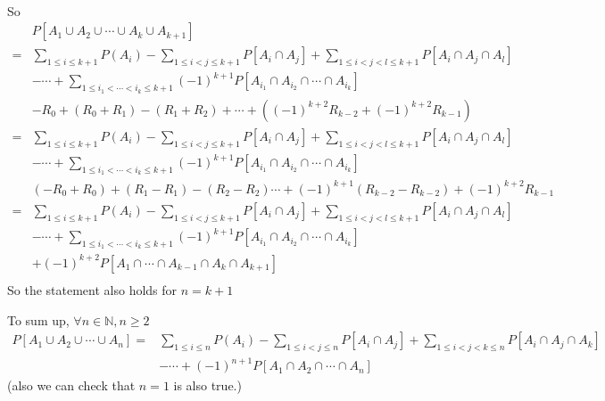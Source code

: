 \documentclass[a4paper,12pt,titlepage]{article}
\begin{document}
\begin{enumerate}
\begin{align*}
\end{align*}
So
\begin{align*}
&P[A_1\cup A_2\cup\cdots\cup A_k\cup A_{k+1}]\\
=&\sum\limits_{1\leqslant i\leqslant k+1}P(A_i)-\sum\limits_{1\leqslant i<j\leqslant k+1}P[A_i\cap A_j]+\sum\limits_{1\leqslant i<j<l\leqslant k+1}P[A_i\cap A_j\cap A_l]\\
&-\cdots+\sum\limits_{1\leqslant i_1<\cdots<i_{k}\leqslant k+1}(-1)^{k+1}P[A_{i_1}\cap A_{i_2}\cap\cdots\cap A_{i_k}]\\
&-R_0+(R_0+R_1)-(R_1+R_2)+\cdots+((-1)^{k+2}R_{k-2}+(-1)^{k+2}R_{k-1})\\
=&\sum\limits_{1\leqslant i\leqslant k+1}P(A_i)-\sum\limits_{1\leqslant i<j\leqslant k+1}P[A_i\cap A_j]+\sum\limits_{1\leqslant i<j<l\leqslant k+1}P[A_i\cap A_j\cap A_l]\\
&-\cdots+\sum\limits_{1\leqslant i_1<\cdots<i_{k}\leqslant k+1}(-1)^{k+1}P[A_{i_1}\cap A_{i_2}\cap\cdots\cap A_{i_k}]\\
&(-R_0+R_0)+(R_1-R_1)-(R_2-R_2)\cdots+(-1)^{k+1}(R_{k-2}-R_{k-2})+(-1)^{k+2}R_{k-1}\\
=&\sum\limits_{1\leqslant i\leqslant k+1}P(A_i)-\sum\limits_{1\leqslant i<j\leqslant k+1}P[A_i\cap A_j]+\sum\limits_{1\leqslant i<j<l\leqslant k+1}P[A_i\cap A_j\cap A_l]\\
&-\cdots+\sum\limits_{1\leqslant i_1<\cdots<i_{k}\leqslant k+1}(-1)^{k+1}P[A_{i_1}\cap A_{i_2}\cap\cdots\cap A_{i_k}]\\
&+(-1)^{k+2}P[A_{1}\cap \cdots\cap A_{k-1}\cap A_k\cap A_{k+1}]\\
\end{align*}
So the statement also holds for $n=k+1$
\end{enumerate}
To sum up, $\forall n\in\mathbb{N},n\geqslant2$
\begin{align*}
P[A_1\cup A_2\cup\cdots\cup A_n]=&\sum\limits_{1\leqslant i\leqslant n}P(A_i)-\sum\limits_{1\leqslant i<j\leqslant n}P[A_i\cap A_j]+\sum\limits_{1\leqslant i<j<k\leqslant n}P[A_i\cap A_j\cap A_k]\\
&-\cdots+(-1)^{n+1}P[A_1\cap A_2\cap\cdots\cap A_n]
\end{align*}
(also we can check that $n=1$ is also true.)
\end{document}
